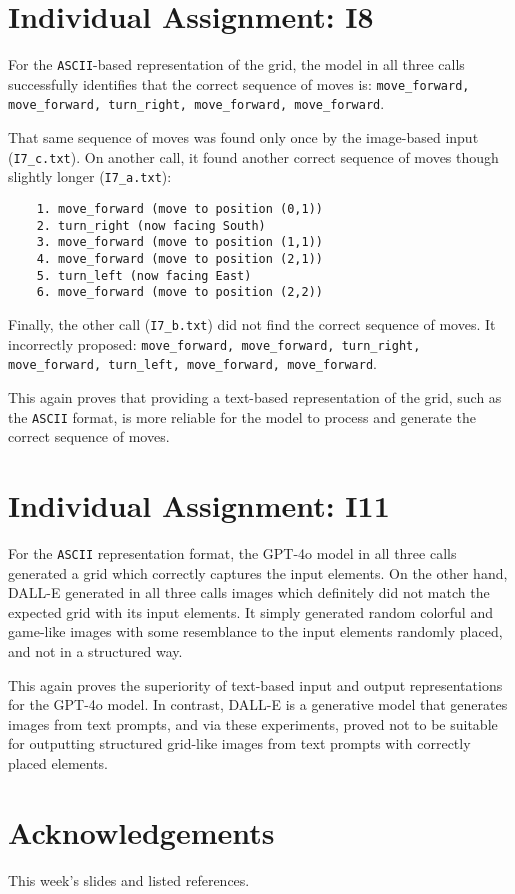 \documentclass{article}
\begin{document}
\section{Individual Assignment: I8}\label{sec:i8}
For the \texttt{ASCII}-based representation of the grid, the model in all three calls successfully identifies that the correct sequence of moves is: \texttt{move\_forward, move\_forward, turn\_right, move\_forward, move\_forward}.

That same sequence of moves was found only once by the image-based input (\texttt{I7\_c.txt}). On another call, it found another correct sequence of moves though slightly longer (\texttt{I7\_a.txt}):

\begin{verbatim}
    1. move_forward (move to position (0,1))
    2. turn_right (now facing South)
    3. move_forward (move to position (1,1))
    4. move_forward (move to position (2,1))
    5. turn_left (now facing East)
    6. move_forward (move to position (2,2))
\end{verbatim}

Finally, the other call (\texttt{I7\_b.txt}) did not find the correct sequence of moves. It incorrectly proposed: \texttt{move\_forward, move\_forward, turn\_right, move\_forward, turn\_left, move\_forward, move\_forward}. 

This again proves that providing a text-based representation of the grid, such as the \texttt{ASCII} format, is more reliable for the model to process and generate the correct sequence of moves.

\section{Individual Assignment: I11}\label{sec:i11}

For the \texttt{ASCII} representation format, the GPT-4o model in all three calls generated a grid which correctly captures the input elements. On the other hand, DALL-E generated in all three calls images which definitely did not match the expected grid with its input elements. It simply generated random colorful and game-like images with some resemblance to the input elements randomly placed, and not in a structured way. 

This again proves the superiority of text-based input and output representations for the GPT-4o model. In contrast, DALL-E is a generative model that generates images from text prompts, and via these experiments, proved not to be suitable for outputting structured grid-like images from text prompts with correctly placed elements.

\clearpage

\section*{Acknowledgements}
This week's slides and listed references.




\clearpage

\end{document}
